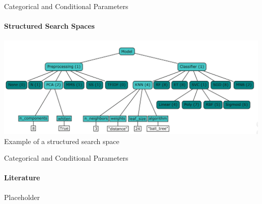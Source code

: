 \begin{frame}[c]{Categorical and Conditional Parameters}
\framesubtitle{Structured Search Spaces}
\begin{center}
    \includegraphics[width=.9\linewidth, height=0.9\textheight, keepaspectratio=true]{images/categ_cond_params/Conditional Parameters AutoML Book.png}
    \newline
    Example of a structured search space 
\end{center}
\end{frame}
\begin{frame}[c]{Categorical and Conditional Parameters}
\framesubtitle{Literature}
\begin{center}
    Placeholder
\end{center}
\end{frame}
